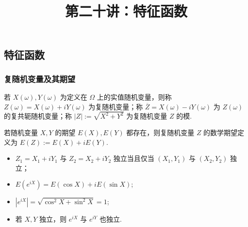 \title[概率论]{第二十讲：特征函数}
\date{}

{ 
	\begin{frame}
		\titlepage
	\end{frame}
}



\subsection{特征函数}
\begin{frame}
	\frametitle{复随机变量及其期望}
	\begin{defi}
		若 $X (\omega),Y (\omega)$ 为定义在 $\Omega$ 上的实值随机变量，则称 $Z (\omega)=X (\omega)+iY (\omega)$ 为复随机变量；称 $\overline{Z}=X (\omega)-iY (\omega)$ 为 $Z (\omega)$ 的复共轭随机变量；称 $|Z|:=\sqrt{X^2+Y^2}$ 为复随机变量 $Z$ 的模.
	\end{defi}
	\pause
	\begin{defi}
		若随机变量 $X,Y$ 的期望 $E (X),E (Y)$ 都存在，则复随机变量 $Z$ 的数学期望定义为 $E (Z):=E (X)+iE (Y)$.
	\end{defi}

	\pause
	\begin{itemize}[<+-|alert@+>]
		\item $Z_1=X_1+iY_1$ 与 $Z_2=X_2+iY_2$ 独立当且仅当 $(X_1,Y_1)$ 与 $(X_2,Y_2)$ 独立；
		\item $E(e^{iX})=E(\cos X)+i E(\sin X)$;
		\item $|e^{iX}|=\sqrt{\cos^2 X+\sin^2 X}=1$;
		\item 若 $X,Y$ 独立，则 $e^{iX}$ 与 $e^{iY}$ 也独立.
	\end{itemize}

\end{frame}


